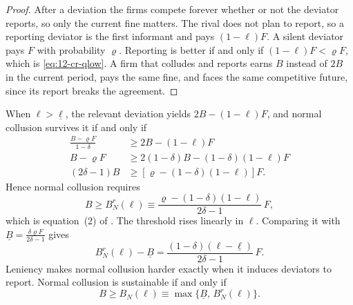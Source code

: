 \begin{proof}
After a deviation the firms compete forever whether or not the deviator reports, so only the current fine matters. The
rival does not plan to report, so a reporting deviator is the first informant and pays $(1-\ell)F$. A silent deviator
pays $F$ with probability $\varrho$. Reporting is better if and only if $(1-\ell)F < \varrho F$, which is
\eqref{eq:12-cr-qlow}. A firm that colludes and reports earns $B$ instead of $2B$ in the current period, pays the same
fine, and faces the same competitive future, since its report breaks the agreement.
\end{proof}

When $\ell > \underline\ell$, the relevant deviation yields $2B - (1-\ell)F$, and normal collusion survives it if
and only if
\begin{align*}
\frac{B - \varrho F}{1-\delta} &\ge 2B - (1-\ell)F\\
B - \varrho F &\ge 2(1-\delta)B - (1-\delta)(1-\ell)F\\
(2\delta - 1)B &\ge [\varrho - (1-\delta)(1-\ell)]F.
\end{align*}
Hence normal collusion requires
\begin{equation}\label{eq:12-cr-BNr}
B \ge B_N^r(\ell) \equiv \frac{\varrho - (1-\delta)(1-\ell)}{2\delta - 1}\,F,
\end{equation}
which is equation~(2) of \citet{ChenRey2013}. The threshold rises linearly in $\ell$. Comparing it with
$\underline B = \frac{\delta\varrho F}{2\delta-1}$ gives
\begin{equation}\label{eq:12-cr-BNr-minus}
B_N^r(\ell) - \underline B = \frac{(1-\delta)(\ell - \underline\ell)}{2\delta - 1}\,F.
\end{equation}
Leniency makes normal collusion harder exactly when it induces deviators to report. Normal collusion is sustainable
if and only if
\begin{equation}\label{eq:12-cr-BN}
B \ge B_N(\ell) \equiv \max\{\underline B,\, B_N^r(\ell)\}.
\end{equation}

